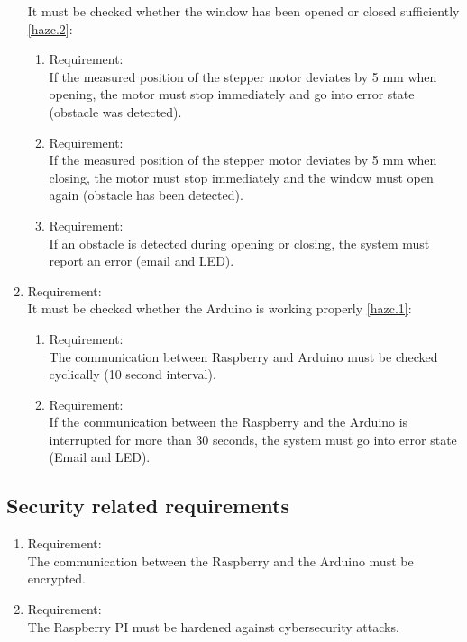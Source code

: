 \begin{enumerate}[label*=\arabic*.]
            It must be checked whether the window has been opened or closed sufficiently \ref{hazc.2}:  \\
  	\begin{enumerate}[label*=\arabic*.]
			\item \label{req.3.1}  Requirement:  \\
			If the measured position of the stepper motor deviates by 5 mm when opening, the motor must stop immediately and go into error state (obstacle was detected).\\ 
   		\item \label{req.3.2}  Requirement:  \\
			If the measured position of the stepper motor deviates by 5 mm when closing, the motor must stop immediately and the window must open again (obstacle has been detected).\\
   		\item \label{req.3.3}  Requirement:  \\
			If an obstacle is detected during opening or closing, the system must report an error (email and LED).\\   
	  \end{enumerate}  
        \item \label{req.4}  Requirement:  \\
        It must be checked whether the Arduino is working properly \ref{hazc.1}: \\
  	\begin{enumerate}[label*=\arabic*.]
			\item \label{req.4.1}  Requirement:  \\
			The communication between Raspberry and Arduino must be checked cyclically (10 second interval).\\  
			\item \label{req.4.1}  Requirement:  \\
            If the communication between the Raspberry and the Arduino is interrupted for more than 30 seconds, the system must go into error state (Email and LED).\\     
	  \end{enumerate}         
	\end{enumerate}

\subsection{Security related requirements}
    \begin{enumerate}[label*=\arabic*.]
        \item \label{sreq.1}  Requirement:  \\
        The communication between the Raspberry and the Arduino must be encrypted. \\ 
        \item \label{sreq.2}  Requirement:  \\
        The Raspberry PI must be hardened against cybersecurity attacks. \\ 
    \end{enumerate}         
